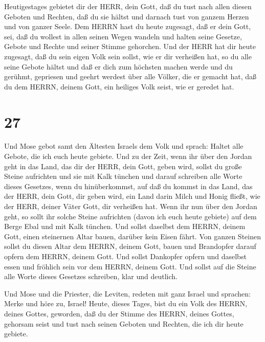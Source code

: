  Heutigestages gebietet dir der HERR, dein Gott, daß du
tust nach allen diesen Geboten und Rechten, daß du sie hältst und
darnach tust von ganzem Herzen und von ganzer Seele.  Dem
HERRN hast du heute zugesagt, daß er dein Gott, sei, daß du wollest in
allen seinen Wegen wandeln und halten seine Gesetze, Gebote und Rechte
und seiner Stimme gehorchen.  Und der HERR hat dir heute
zugesagt, daß du sein eigen Volk sein sollst, wie er dir verheißen hat,
so du alle seine Gebote hältst  und daß er dich zum
höchsten machen werde und du gerühmt, gepriesen und geehrt werdest über
alle Völker, die er gemacht hat, daß du dem HERRN, deinem Gott, ein
heiliges Volk seist, wie er geredet hat.

\hypertarget{section-26}{%
\section{27}\label{section-26}}

 Und Mose gebot samt den Ältesten Israels dem Volk und
sprach: Haltet alle Gebote, die ich euch heute gebiete.  Und
zu der Zeit, wenn ihr über den Jordan geht in das Land, das dir der
HERR, dein Gott, geben wird, sollst du große Steine aufrichten und sie
mit Kalk tünchen  und darauf schreiben alle Worte dieses
Gesetzes, wenn du hinüberkommst, auf daß du kommst in das Land, das der
HERR, dein Gott, dir geben wird, ein Land darin Milch und Honig fließt,
wie der HERR, deiner Väter Gott, dir verheißen hat.  Wenn
ihr nun über den Jordan geht, so sollt ihr solche Steine aufrichten
(davon ich euch heute gebiete) auf dem Berge Ebal und mit Kalk tünchen.
 Und sollst daselbst dem HERRN, deinem Gott, einen
steinernen Altar bauen, darüber kein Eisen fährt.  Von
ganzen Steinen sollst du diesen Altar dem HERRN, deinem Gott, bauen und
Brandopfer darauf opfern dem HERRN, deinem Gott.  Und sollst
Dankopfer opfern und daselbst essen und fröhlich sein vor dem HERRN,
deinem Gott.  Und sollst auf die Steine alle Worte dieses
Gesetzes schreiben, klar und deutlich.

 Und Mose und die Priester, die Leviten, redeten mit ganz
Israel und sprachen: Merke und höre zu, Israel! Heute, dieses Tages,
bist du ein Volk des HERRN, deines Gottes, geworden,  daß
du der Stimme des HERRN, deines Gottes, gehorsam seist und tust nach
seinen Geboten und Rechten, die ich dir heute gebiete.

